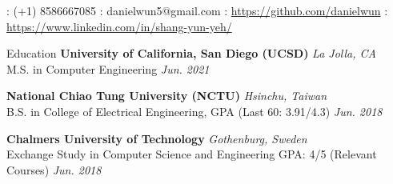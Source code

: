\documentclass{resume} %
\begin{document}
{\faPhone: (+1) 8586667085}
{\faEnvelope: danielwun5@gmail.com}
{  \faGithub: \url{https://github.com/danielwun}}
{  \faLinkedin: \url{https://www.linkedin.com/in/shang-yun-yeh/}}






\begin{rSection}{Education}
{\bf University of California, San Diego (UCSD)} \hfill {\em La Jolla, CA} 
\\ {M.S. in Computer Engineering \hfill {\em Jun. 2021}}
\par
{\bf National Chiao Tung University (NCTU)} \hfill {\em Hsinchu, Taiwan} 
\\ {B.S. in College of Electrical Engineering, GPA (Last 60: 3.91/4.3) \hfill {\em Jun. 2018}}
\par
{\bf Chalmers University of Technology} \hfill {\em Gothenburg, Sweden} 
\\ {Exchange Study in Computer Science and Engineering GPA: 4/5 (Relevant Courses)}
\hfill {\em Jun. 2018} 
\par

\end{rSection}



\end{document}
